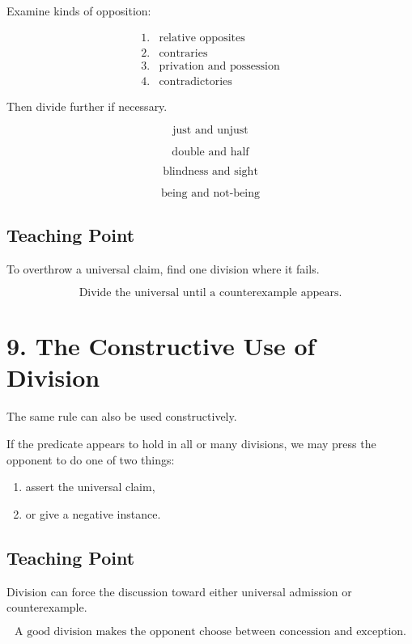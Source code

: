 \documentclass[12pt]{article}
\begin{document}
Examine kinds of opposition:

\[
\begin{array}{ll}
1. & \text{relative opposites} \\
2. & \text{contraries} \\
3. & \text{privation and possession} \\
4. & \text{contradictories}
\end{array}
\]

Then divide further if necessary.

\[
\text{just and unjust}
\]

\[
\text{double and half}
\]

\[
\text{blindness and sight}
\]

\[
\text{being and not-being}
\]

\subsection*{Teaching Point}

To overthrow a universal claim, find one division where it fails.

\[
\boxed{
\text{Divide the universal until a counterexample appears.}
}
\]

\section*{9. The Constructive Use of Division}

The same rule can also be used constructively.

If the predicate appears to hold in all or many divisions, we may press the
opponent to do one of two things:

\begin{enumerate}[itemsep=0.25em]
    \item assert the universal claim,
    \item or give a negative instance.
\end{enumerate}

\subsection*{Teaching Point}

Division can force the discussion toward either universal admission or
counterexample.

\[
\boxed{
\text{A good division makes the opponent choose between concession and exception.}
}
\]
\end{document}
